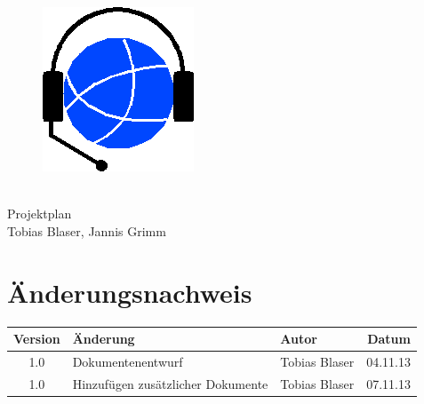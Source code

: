 

\providecommand{\documentType}{Projektplan}
\providecommand{\versionnumber}{1.0}



\thispagestyle{empty}
\begin{titlepage}
	\begin{center}

	\vspace*{40mm}
	
	\begin{figure}[htp]
		\centering
		\includegraphics[scale=0.60]{../img/icon-js-voip.png}
	\end{figure}		
	\vspace*{20mm}
	
	{\fontsize{40}{48} \selectfont \project \\[10mm]}
	{\fontsize{40}{48} \selectfont \documentType \\[5mm]}	
	\vspace*{20mm}
	Tobias Blaser, Jannis Grimm

\end{center}
\end{titlepage}
\clearpage

\chapter*{Änderungsnachweis}
\begin{tabularx}{\textwidth}{|cXlr|} %
		\hline
		\textbf{Version} & \textbf{Änderung} & \textbf{Autor} & \textbf{Datum}\\
		\hline
		1.0 & Dokumentenentwurf & Tobias Blaser & 04.11.13\\
		1.0 & Hinzufügen zusätzlicher Dokumente & Tobias Blaser & 07.11.13\\
		\hline
\end{tabularx}

\tableofcontents

